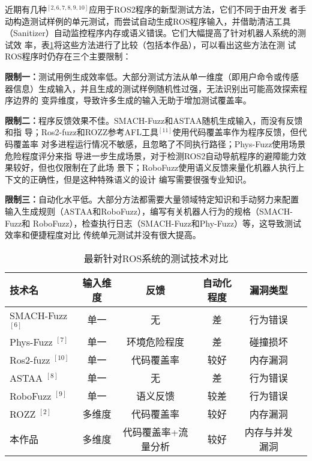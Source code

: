 近期有几种$^{[2, 6, 7, 8, 9, 10]}$应用于ROS2程序的新型测试方法，它们不同于由开发
者手动构造测试样例的单元测试，而尝试自动生成ROS程序输入，并借助清洁工具
（Sanitizer）自动监控程序内存或语义错误。它们大幅提高了针对机器人系统的测试效
率，表\ref{tab:fuzzers}将这些方法进行了比较（包括本作品），可以看出这些方法在测
试ROS程序时仍存在三个主要限制：

\textbf{限制一：}测试用例生成效率低。大部分测试方法从单一维度（即用户命令或传感
器信息）生成输入，并且生成的测试样例随机性过强，无法识别出可能高效探索程序边界的
变异维度，导致许多生成的输入无助于增加测试覆盖率。

\textbf{限制二：}程序反馈效果不佳。SMACH-Fuzz和ASTAA随机生成输入，而没有反馈和指
导；Ros2-fuzz和ROZZ参考AFL工具$^{[11]}$使用代码覆盖率作为程序反馈，但代码覆盖率
对多进程运行情况不敏感，且忽略了不同执行路径；Phys-Fuzz使用场景危险程度评分来指
导进一步生成场景，对于检测ROS2自动导航程序的避障能力效果较好，但也仅限制在了此场
景下；RoboFuzz使用语义反馈来量化机器人执行上下文的正确性，但是这种特殊语义的设计
编写需要很强专业知识。

\textbf{限制三：}自动化水平低。大部分方法都需要大量领域特定知识和手动努力来配置
输入生成规则（ASTAA和RoboFuzz），编写有关机器人行为的规格（SMACH-Fuzz和
RoboFuzz），检查执行日志（SMACH-Fuzz和Phy-Fuzz）等，这导致测试效率和便捷程度对比
传统单元测试并没有很大提高。

\begin{table}[H]
\small
\centering
\caption{最新针对ROS系统的测试技术对比}
\begin{tabular}{lccccc}
\hline
\textbf{技术名} & \textbf{输入维度}  & \textbf{反馈}& \textbf{自动化程度} & \textbf{漏洞类型} \\ \hline
SMACH-Fuzz $^{[6]}$ & 单一 & 无 & 差 & 行为错误 \\ 
Phys-Fuzz $^{[7]}$ & 单一  & 环境危险程度  & 差& 碰撞损坏 \\ 
Ros2-fuzz $^{[10]}$ & 单一  & 代码覆盖率   & 较好 & 内存漏洞 \\ 
ASTAA $^{[8]}$ & 单一 & 无 & 差 & 行为错误 \\ 
RoboFuzz $^{[9]}$ & 单一  & 语义反馈 & 较差 & 行为错误 \\ 
ROZZ $^{[2]}$ & 多维度 & 代码覆盖率 & 较好 & 内存漏洞 \\ 
本作品 & 多维度  & 代码覆盖率+流量分析 & 较好& 内存与并发漏洞 \\ \hline
\end{tabular}
\label{tab:fuzzers}
\end{table}
